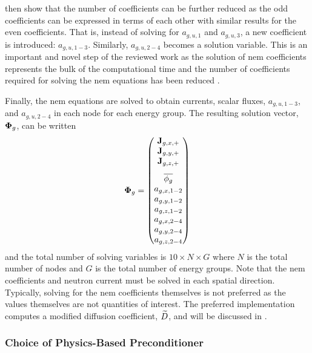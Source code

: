       \citeauthor{qe2paper} then show that the number of coefficients can be
      further reduced as the odd coefficients can be expressed in terms of
      each other with similar results for the even coefficients. That is,
      instead of solving for $a_{g,u,1}$ and $a_{g,u,3}$, a new coefficient is
      introduced: $a_{g,u,1-3}$. Similarly, $a_{g,u,2-4}$ becomes a solution
      variable. This is an important and novel step of the reviewed work as the
      solution of \gls{nem} coefficients represents the bulk of the
      computational time and the number of coefficients required for solving the
      \gls{nem} equations has been reduced \cite{qe2paper}.

      Finally, the \gls{nem} equations are solved to obtain currents, scalar
      fluxes, $a_{g,u,1-3}$, and $a_{g,u,2-4}$ in each node for each energy
      group. The resulting solution vector, $\mathbf{\Phi}_g$, can be written 
      \begin{equation}
        \label{eq:solution_vector}
        \vPhi_g =
        \begin{pmatrix}
          \current_{g,x,+} \\
          \current_{g,y,+} \\
          \vspace{8pt}
          \current_{g,z,+} \\
          \overline{\phi_g} \\
          a_{g,x,1-2} \\
          a_{g,y,1-2} \\
          a_{g,z,1-2} \\
          a_{g,x,2-4} \\
          a_{g,y,2-4} \\
          a_{g,z,2-4}
        \end{pmatrix}
      \end{equation}
      and the total number of solving variables is $10 \times N \times G$ where
      $N$ is the total number of nodes and $G$ is the total number of energy
      groups. Note that the \gls{nem} coefficients and neutron current must be
      solved in each spatial direction. Typically, solving for the \gls{nem}
      coefficients themselves is not preferred as the values themselves are not
      quantities of interest.  The preferred implementation computes a modified
      diffusion coefficient, $\widetilde{D}$, and will be discussed in
      .

    \subsubsection{Choice of Physics-Based Preconditioner}

